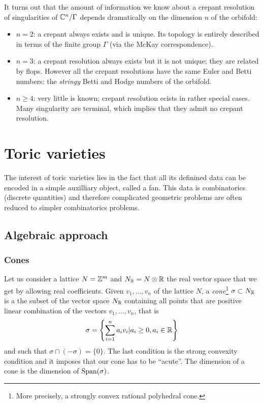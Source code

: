         It turns out that the amount of information we know about a crepant resolution of singularities of $\mathbb{C}^n/\Gamma$ depends dramatically on the dimension $n$ of the orbifold:
        \begin{itemize}
            \item $n=2$: a crepant always exists and is unique. Its topology is entirely described in terms of the finite group $\Gamma$ (via the McKay correspondence).
            \item $n=3$: a crepant resolution always exists but it is not unique; they are related by flops. However all the crepant resolutions have the same Euler and Betti numbers: the \emph{stringy} Betti and Hodge numbers of the orbifold.
            \item $n\geq4$: very little is known; crepant resolution ecists in rather special cases. Many singularity are terminal, which implies that they admit no crepant resolution.
        \end{itemize}


\section{Toric varieties}

    The interest of toric varieties lies in the fact that all its definined data can be encoded in a simple auxilliary object, called a fan. This data is combinatorics (discrete quantities) and therefore complicated geometric problems are often reduced to simpler combinatorics problems.

    \subsection{Algebraic approach}

        \subsubsection{Cones}

            Let us consider a lattice $N=\mathbb{Z}^m$ and $N_{\mathbb{R}}=N\otimes\mathbb{R}$ the real vector space that we get by allowing real coefficients. Given $v_1,\dots,v_n$ of the lattice $N$, a \emph{cone}\footnote{More precisely, a strongly convex rational polyhedral cone.} $\sigma\subset N_{\mathbb{R}}$ is a the subset of the vector space $N_{\mathbb{R}}$ containing all points that are positive linear combination of the vectors $v_1,\dots,v_n$, that is
            \begin{equation}
                \sigma=\left\{\sum^n_{i=1}a_iv_i|a_i\geq0,a_i\in\mathbb{R}\right\}
            \end{equation}
            and such that $\sigma\cap(-\sigma)=\{0\}$. The last condition is the strong convexity condition and it imposes that our cone has to be ``acute''. The dimension of a cone is the dimension of $\text{Span}(\sigma)$. 
            
